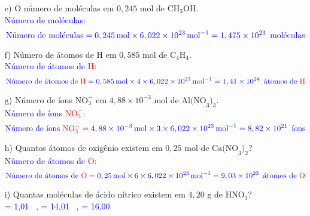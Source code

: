 \documentclass[a4paper, 12pt]{article}
\begin{document}
\begin{enumerate}
\begin{enumerate}[align=left, labelsep=-0.5em]
              \item[e)] O número de moléculas em \(0,245\) mol de \(\text{CH}_{3}\text{OH}\).
                    \\[10pt]
                    \textcolor{blue}{Número de moléculas:}
                    \[
                        \textcolor{blue}{\text{Número de moléculas} = 0,245 \, \text{mol} \times 6,022 \times 10^{23} \, \text{mol}^{-1} = 1,475 \times 10^{23} \, \text{ moléculas}}
                    \]
              \item[f)] Número de átomos de H em \(0,585\) mol de \(\text{C}_{4}\text{H}_{4}\).
                    \\[10pt]
                    \textcolor{blue}{Número de átomos de \textcolor{red}{H}:}
                    \[
                        \textcolor{blue}{\text{Número de átomos de \textcolor{red}{H}} = 0,585 \, \text{mol} \times 4 \times 6,022 \times 10^{23} \, \text{mol}^{-1} = 1,41 \times 10^{24} \, \text{ átomos de \textcolor{red}{H}}}
                    \]
              \item[g)] Número de íons \(\text{NO}_{3}^{-}\) em \(4,88 \times 10^{-3}\) mol de \(\text{Al(NO}_{3})_{3}\).
                    \\[10pt]
                    \textcolor{blue}{Número de íons \textcolor{red}{\(\text{NO}_{3}^{-}\)}:}
                    \[
                        \textcolor{blue}{\text{Número de íons } \textcolor{red}{\text{NO}_{3}^{-}} = 4,88 \times 10^{-3} \, \text{mol} \times 3 \times 6,022 \times 10^{23} \, \text{mol}^{-1} = 8,82 \times 10^{21} \, \text{ íons}}
                    \]
              \item[h)] Quantos átomos de oxigênio existem em \(0,25\) mol de \(\text{Ca(NO}_{3})_{2}\)?
                    \\[10pt]
                    \textcolor{blue}{Número de átomos de \textcolor{red}{O}:}
                    \[
                        \textcolor{blue}{\text{Número de átomos de \textcolor{red}{O}} = 0,25 \, \text{mol} \times 6 \times 6,022 \times 10^{23} \, \text{mol}^{-1} = 9,03 \times 10^{23} \, \text{ átomos de \textcolor{red}{O}}}
                    \]
              \item[i)] Quantas moléculas de ácido nítrico existem em \(4,20\) g de \(\text{HNO}_{3}\)?
                    \\[10pt]
                    \textcolor{blue}{\textcolor{red}{} = 1,01 \, , \quad \textcolor{red}{} = 14,01 \, , \quad \textcolor{red}{} = 16,00 \, }

\end{enumerate}
\end{enumerate}
\end{document}
